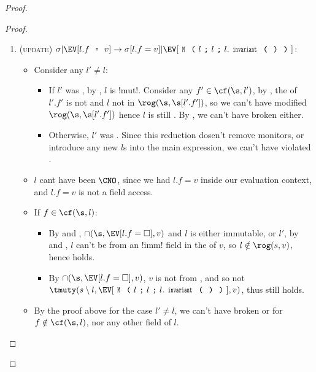 \begin{proof}
\begin{proof}
\begin{enumerate}
\item (\textsc{update}) $\sigma|\EV[l.f\equals{}v]\rightarrow \sigma[l.f=v]|\EV[\M{l}{l}{l.\invariant}]$:
\begin{itemize}
\item Consider any $l' \neq l$:
\begin{itemize}
		\item If $l'$ was \CNE, by , $l$ is \Q!mut!. Consider any $f' \in \cf(\s, l')$, by \CNE, the \rog of $l'.f'$ is not \tmuty and $l$ not in $\rog(\s, \s[l'.f'])$, so we can't have modified $\rog(\s, \s[l'.f'])$ hence $l$ is still \CNC. By , we can't have broken \CNE either.
		\item Otherwise, $l'$ was \CNO. Since this reduction dosen't remove monitors, or introduce any new $l$s into the main expression, we can't have violated \CNO.
\end{itemize}
\item $l$ cant have been $\CNO$, since we had $l.f = v$ inside our evaluation context, and $l.f = v$ is not a field access.
\item If $f \in \cf(\s, l)$:
\begin{itemize} 
\item By  and , $\cap(\s, \EV[l.f = \square], v)$ and $l$ is either immutable, or $l'$, by  and , $l$ can't be \reach from an \Q!imm! field in the \rog of $v$, so $l\notin \rog(s, v)$, hence \CNC holds.
\item By $\cap(\s, \EV[l.f = \square], v)$, $v$ is not \tmuty from \EV, and so not $\tmuty(s\setminus l, \EV[\M{l}{l}{l.\invariant}], v)$, thus \CNE still holds.
\end{itemize}
\item By the proof above for the case $l' \neq l$, we can't have broken \CNE or \CNC for $f \notin \cf(\s, l)$, nor any other field of $l$.
\end{itemize}



\end{enumerate}
\end{proof}
\end{proof}

